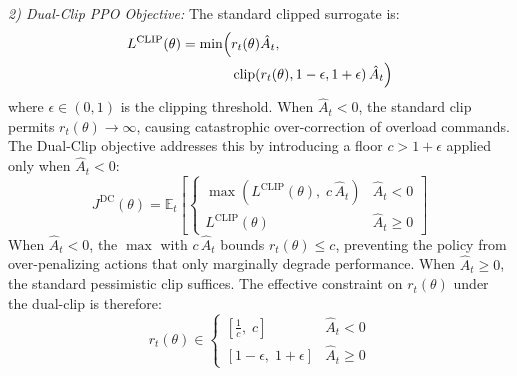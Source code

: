 \documentclass[lettersize,journal]{IEEEtran}
\begin{document}
\emph{2) Dual-Clip PPO Objective:} The standard clipped surrogate is:
\begin{equation}
\label{eq:standard_clip}
\begin{split}
L^{\mathrm{CLIP}}(\theta) = \min \Bigl( &r_t(\theta)\hat{A}_t, \\
&\operatorname{clip}\!\left(r_t(\theta), 1-\epsilon, 1+\epsilon\right)\hat{A}_t \Bigr)
\end{split}
\end{equation}
where $\epsilon \in (0,1)$ is the clipping threshold. When $\hat{A}_t < 0$, the standard clip permits $r_t(\theta) \to \infty$, causing catastrophic over-correction of overload commands. The Dual-Clip objective addresses this by introducing a floor $c > 1+\epsilon$ applied only when $\hat{A}_t < 0$:
\begin{equation}
\label{eq:dual_clip_final}
J^{\mathrm{DC}}(\theta) = \mathbb{E}_{t} \left[
\begin{cases}
\max\!\left( L^{\mathrm{CLIP}}(\theta),\; c\,\hat{A}_t \right) & \hat{A}_t < 0 \\[4pt]
L^{\mathrm{CLIP}}(\theta) & \hat{A}_t \geq 0
\end{cases}
\right]
\end{equation}
When $\hat{A}_t < 0$, the $\max$ with $c\,\hat{A}_t$ bounds $r_t(\theta) \leq c$, preventing the policy from over-penalizing actions that only marginally degrade performance. When $\hat{A}_t \geq 0$, the standard pessimistic clip suffices. The effective constraint on $r_t(\theta)$ under the dual-clip is therefore:
\begin{equation}
\label{eq:rt_bound}
r_t(\theta) \in \begin{cases} \left[\frac{1}{c},\; c\right] & \hat{A}_t < 0 \\[4pt] \left[1-\epsilon,\; 1+\epsilon\right] & \hat{A}_t \geq 0 \end{cases}
\end{equation}
\end{document}
